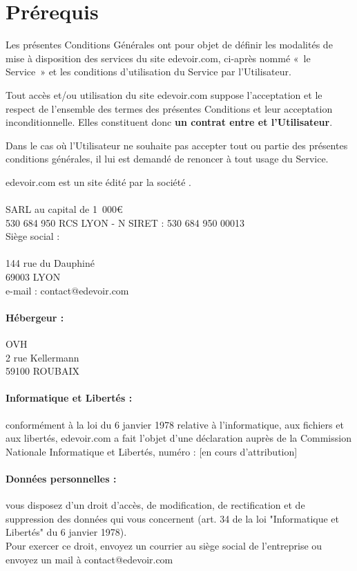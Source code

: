 \section{Prérequis}

Les présentes Conditions Générales ont pour objet de définir les modalités de mise à disposition des services du site edevoir.com, ci-après nommé «~le Service~» et les conditions d'utilisation du Service par l'Utilisateur.

Tout accès et/ou utilisation du site edevoir.com suppose l'acceptation et le respect de l'ensemble des termes des présentes Conditions et leur acceptation inconditionnelle. Elles constituent donc \textbf{un contrat entre \eDevoir et l'Utilisateur}.

Dans le cas où l'Utilisateur ne souhaite pas accepter tout ou partie des présentes conditions générales, il lui est demandé de renoncer à tout usage du Service.

edevoir.com est un site édité par la société \eDevoir.

\paragraph*{\eDevoir}
SARL au capital de 1~000\euro\\
530 684 950 RCS LYON - N SIRET : 530 684 950 00013\\
Siège social :\\
\eDevoir\\
144 rue du Dauphiné\\
69003 LYON\\
e-mail : contact@edevoir.com

\paragraph*{Hébergeur :}
OVH\\
2 rue Kellermann\\
59100 ROUBAIX

\paragraph*{Informatique et Libertés :}
conformément à la loi du 6 janvier 1978 relative à l'informatique, aux fichiers et aux libertés, edevoir.com a fait l'objet d'une déclaration auprès de la Commission Nationale Informatique et Libertés, numéro : [en cours d'attribution]

\paragraph*{Données personnelles :}
vous disposez d'un droit d'accès, de modification, de rectification et de suppression des données qui vous concernent (art. 34 de la loi "Informatique et Libertés" du 6 janvier 1978).\\
Pour exercer ce droit, envoyez un courrier au siège social de l'entreprise ou envoyez un mail à contact@edevoir.com



